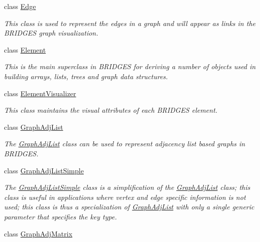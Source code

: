 \begin{DoxyCompactItemize}
class \mbox{\hyperlink{classbridges_1_1base_1_1_edge}{Edge}}
\begin{DoxyCompactList}\small\item\em This class is used to represent the edges in a graph and will appear as links in the B\+R\+I\+D\+G\+ES graph visualization. \end{DoxyCompactList}\item 
class \mbox{\hyperlink{classbridges_1_1base_1_1_element}{Element}}
\begin{DoxyCompactList}\small\item\em This is the main superclass in B\+R\+I\+D\+G\+ES for deriving a number of objects used in building arrays, lists, trees and graph data structures. \end{DoxyCompactList}\item 
class \mbox{\hyperlink{classbridges_1_1base_1_1_element_visualizer}{Element\+Visualizer}}
\begin{DoxyCompactList}\small\item\em This class maintains the visual attributes of each B\+R\+I\+D\+G\+ES element. \end{DoxyCompactList}\item 
class \mbox{\hyperlink{classbridges_1_1base_1_1_graph_adj_list}{Graph\+Adj\+List}}
\begin{DoxyCompactList}\small\item\em The \mbox{\hyperlink{classbridges_1_1base_1_1_graph_adj_list}{Graph\+Adj\+List}} class can be used to represent adjacency list based graphs in B\+R\+I\+D\+G\+ES. \end{DoxyCompactList}\item 
class \mbox{\hyperlink{classbridges_1_1base_1_1_graph_adj_list_simple}{Graph\+Adj\+List\+Simple}}
\begin{DoxyCompactList}\small\item\em The \mbox{\hyperlink{classbridges_1_1base_1_1_graph_adj_list_simple}{Graph\+Adj\+List\+Simple}} class is a simplification of the \mbox{\hyperlink{classbridges_1_1base_1_1_graph_adj_list}{Graph\+Adj\+List}} class; this class is useful in applications where vertex and edge specific information is not used; this class is thus a specialization of \mbox{\hyperlink{classbridges_1_1base_1_1_graph_adj_list}{Graph\+Adj\+List}} with only a single generic parameter that specifies the key type. \end{DoxyCompactList}\item 
class \mbox{\hyperlink{classbridges_1_1base_1_1_graph_adj_matrix}{Graph\+Adj\+Matrix}}

\end{DoxyCompactItemize}
